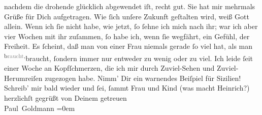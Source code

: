 \begin{ledgroupsized}[t]{13cm}
               nachdem die drohende \label{K_L03442-13v}\label{K_L03442-13h}{ } glücklich abgewendet iſt, recht gut. Sie hat mir
                   mehrmals Grüße für Dich aufgetragen. Wie
               ſich unſere Zukunft geſtalten wird, weiß Gott allein. Wenn {\pb} ich ſie nicht habe,
               wie jetzt, ſo ſehne ich mich nach ihr; war ich aber vier Wochen mit ihr zuſammen, ſo
               habe ich, wenn ſie wegfährt, ein Gefühl,  der Freiheit. Es ſcheint, daß man von einer Frau niemals gerade ſo viel hat,
               als man \substVorne{}\textsuperscript{b\textcolor{gray}{raucht},}{\allowbreak}\substDazwischen{}braucht,\substHinten{} ſondern immer nur entweder zu wenig oder zu viel.\pend
           \pstart
           Ich leide ſeit einer Woche an Kopfſchmerzen, die ich mir durch Zuviel-Sehen und
               Zuviel-Herumreiſen zugezogen habe. Nimm’ Dir ein warnendes Beiſpiel für Sizilien!\pend
           \pstart
           Schreib’ mir bald wieder und ſei, ſammt Frau und Kind (was macht Heinrich?) herzlichſt
               gegrüßt von Deinem getreuen {\\[\baselineskip]}\spacefill\mbox{Paul Goldmann}\pend
           \leftskip=0em{}
         
         \endnumbering{}\end{ledgroupsized}\begin{anhang}\end{anhang}\newcommand{\dateiname}{L03442}\newcommand{\titel}{Paul Goldmann an Arthur Schnitzler, 8. 4. [1904]}\newcommand{\editorInnen}{Martin Anton Müller und Laura Untner}
      